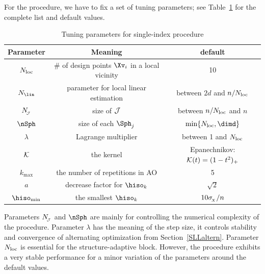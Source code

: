 For the procedure, we have to fix a set of tuning parameters; see Table~\ref{TdefSI}
for the complete list and default values.
%
\begin{table}[h]
\begin{tabular}{c|c|c}
        \hline
        Parameter & Meaning & default \\
        \hline
        \( N_{\operatorname{loc}} \) & \( \# \) of design points \( \Xv_{i} \) in a local vicinity & 10 \\
        \( \numb_{\lin} \) & parameter for local linear estimation & 
        between \( 2d \) and \( n/N_{\operatorname{loc}} \) \\
        \( N_{\!_{\mathcal{J}}} \) & size of \( \mathcal{J} \) 				& between \( n/N_{\operatorname{loc}} \) and \( n \) \\
		\( \nSph \) & size of each \( \Sph_{j} \)		& \( \min\{ \nmin, \dimd \} \) \\
		\( \lambda \) & Lagrange multiplier 		& between 1 and \( N_{\operatorname{loc}} \) \\
		\( \mathcal{K} \) & the kernel & Epanechnikov: \( \mathcal{K}(t) = (1-t^{2})_{+} \) \\
		\( k_{\max} \) & the number of repetitions in AO & 5 \\
		\( a \)	& decrease factor for \( \hiso_{k} \) & \( \sqrt{2} \) \\
		\( \hiso_{\min} \) & the smallest \( \hiso_{k} \) & \( 10 \sigma_{\!_{X}}/n \) \\
		\hline
    \end{tabular}
\caption{Tuning parameters for single-index procedure}    
\label{TdefSI}
\end{table}
%
%
%
%
%
%
%
%
%
Parameters \( N_{\!_{\mathcal{J}}} \) and \( \nSph \) are mainly for controlling the numerical
complexity of the procedure.
Parameter \( \lambda \) has the meaning of the step size, 
it controls stability and convergence of alternating optimization
from Section~\ref{SLLaltern}.
Parameter \( N_{\operatorname{loc}} \) is essential for the structure-adaptive block.
However, the procedure exhibits a very stable performance 
for a minor variation of the parameters around the default values.

